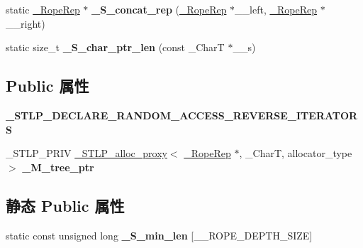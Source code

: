 \begin{DoxyCompactItemize}
\item 
\mbox{\label{classrope_a69820251d382e61bfabc753904046665}} 
static \hyperlink{struct___rope___rope_rep}{\+\_\+\+Rope\+Rep} $\ast$ {\bfseries \+\_\+\+S\+\_\+concat\+\_\+rep} (\hyperlink{struct___rope___rope_rep}{\+\_\+\+Rope\+Rep} $\ast$\+\_\+\+\_\+left, \hyperlink{struct___rope___rope_rep}{\+\_\+\+Rope\+Rep} $\ast$\+\_\+\+\_\+right)
\item 
\mbox{\label{classrope_ac5b2f180710a2b6bb619c9b22c948618}} 
static size\+\_\+t {\bfseries \+\_\+\+S\+\_\+char\+\_\+ptr\+\_\+len} (const \+\_\+\+CharT $\ast$\+\_\+\+\_\+s)
\end{DoxyCompactItemize}
\subsection*{Public 属性}
\begin{DoxyCompactItemize}
\item 
\mbox{\label{classrope_af8ea40014c9254a6e133a2858216a52c}} 
{\bfseries \+\_\+\+S\+T\+L\+P\+\_\+\+D\+E\+C\+L\+A\+R\+E\+\_\+\+R\+A\+N\+D\+O\+M\+\_\+\+A\+C\+C\+E\+S\+S\+\_\+\+R\+E\+V\+E\+R\+S\+E\+\_\+\+I\+T\+E\+R\+A\+T\+O\+RS}
\item 
\mbox{\label{classrope_ac349c57339a05be448c054f1224f1093}} 
\+\_\+\+S\+T\+L\+P\+\_\+\+P\+R\+IV \hyperlink{class___s_t_l_p__alloc__proxy}{\+\_\+\+S\+T\+L\+P\+\_\+alloc\+\_\+proxy}$<$ \hyperlink{struct___rope___rope_rep}{\+\_\+\+Rope\+Rep} $\ast$, \+\_\+\+CharT, allocator\+\_\+type $>$ {\bfseries \+\_\+\+M\+\_\+tree\+\_\+ptr}
\end{DoxyCompactItemize}
\subsection*{静态 Public 属性}
\begin{DoxyCompactItemize}
\item 
\mbox{\label{classrope_a38a62ddb9b036364a414aa72c80ea487}} 
static const unsigned long {\bfseries \+\_\+\+S\+\_\+min\+\_\+len} \mbox{[}\+\_\+\+\_\+\+R\+O\+P\+E\+\_\+\+D\+E\+P\+T\+H\+\_\+\+S\+I\+ZE\mbox{]}
\end{DoxyCompactItemize}

